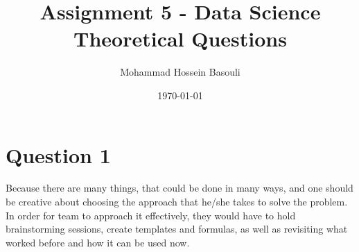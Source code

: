 \documentclass[a4paper,12pt]{article}
\begin{document}
\title{Assignment 5 - Data Science \\
Theoretical Questions}
\author{Mohammad Hossein Basouli}
\date{\today}
\maketitle

\section*{Question 1}
Because there are many things, that could be done in many ways, and one should be creative about choosing the approach that he/she takes to solve the problem. In order for team to approach it effectively, 
they would have to hold brainstorming sessions, create templates and formulas, as well as revisiting what worked before and how it can be used now.
\end{document}
